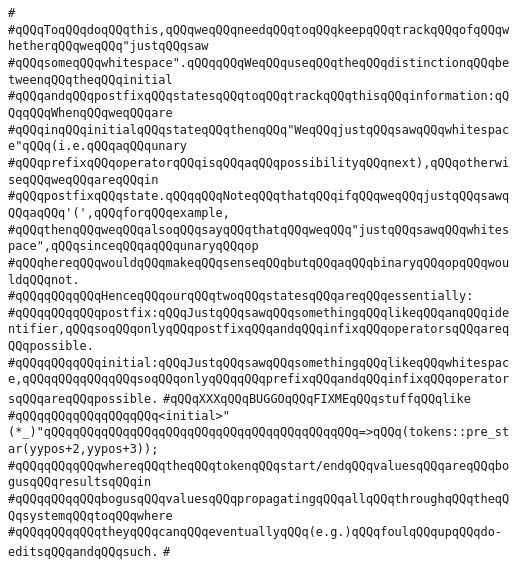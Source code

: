 \verb|#|\newline
\verb|#qQQqToqQQqdoqQQqthis,qQQqweqQQqneedqQQqtoqQQqkeepqQQqtrackqQQqofqQQqwhetherqQQqweqQQq"justqQQqsaw|\newline
\verb|#qQQqsomeqQQqwhitespace".qQQqqQQqWeqQQquseqQQqtheqQQqdistinctionqQQqbetweenqQQqtheqQQqinitial|\newline
\verb|#qQQqandqQQqpostfixqQQqstatesqQQqtoqQQqtrackqQQqthisqQQqinformation:qQQqqQQqWhenqQQqweqQQqare|\newline
\verb|#qQQqinqQQqinitialqQQqstateqQQqthenqQQq"WeqQQqjustqQQqsawqQQqwhitespace"qQQq(i.e.qQQqaqQQqunary|\newline
\verb|#qQQqprefixqQQqoperatorqQQqisqQQqaqQQqpossibilityqQQqnext),qQQqotherwiseqQQqweqQQqareqQQqin|\newline
\verb|#qQQqpostfixqQQqstate.qQQqqQQqNoteqQQqthatqQQqifqQQqweqQQqjustqQQqsawqQQqaqQQq'(',qQQqforqQQqexample,|\newline
\verb|#qQQqthenqQQqweqQQqalsoqQQqsayqQQqthatqQQqweqQQq"justqQQqsawqQQqwhitespace",qQQqsinceqQQqaqQQqunaryqQQqop|\newline
\verb|#qQQqhereqQQqwouldqQQqmakeqQQqsenseqQQqbutqQQqaqQQqbinaryqQQqopqQQqwouldqQQqnot.|\newline
\verb|#qQQqqQQqqQQqHenceqQQqourqQQqtwoqQQqstatesqQQqareqQQqessentially:|\newline
\verb|#qQQqqQQqqQQqpostfix:qQQqJustqQQqsawqQQqsomethingqQQqlikeqQQqanqQQqidentifier,qQQqsoqQQqonlyqQQqpostfixqQQqandqQQqinfixqQQqoperatorsqQQqareqQQqpossible.|\newline
\verb|#qQQqqQQqqQQqinitial:qQQqJustqQQqsawqQQqsomethingqQQqlikeqQQqwhitespace,qQQqqQQqqQQqqQQqsoqQQqonlyqQQqqQQqprefixqQQqandqQQqinfixqQQqoperatorsqQQqareqQQqpossible.|\newline
\newline
\verb|#qQQqXXXqQQqBUGGOqQQqFIXMEqQQqstuffqQQqlike|\newline
\verb|#qQQqqQQqqQQqqQQqqQQq<initial>"(*_)"qQQqqQQqqQQqqQQqqQQqqQQqqQQqqQQqqQQqqQQqqQQq=>qQQq(tokens::pre_star(yypos+2,yypos+3));|\newline
\verb|#qQQqqQQqqQQqwhereqQQqtheqQQqtokenqQQqstart/endqQQqvaluesqQQqareqQQqbogusqQQqresultsqQQqin|\newline
\verb|#qQQqqQQqqQQqbogusqQQqvaluesqQQqpropagatingqQQqallqQQqthroughqQQqtheqQQqsystemqQQqtoqQQqwhere|\newline
\verb|#qQQqqQQqqQQqtheyqQQqcanqQQqeventuallyqQQq(e.g.)qQQqfoulqQQqupqQQqdo-editsqQQqandqQQqsuch.|\newline
\verb|#|\newline

